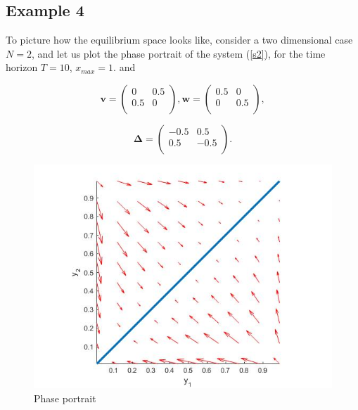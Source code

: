 \documentclass[a4paper,10pt, english]{article}
\begin{document}
\newpage
\newpage
\newpage
\subsection{Example 4}
To picture how the equilibrium space looks like, consider a two dimensional case  $N=2$, and let us plot the phase portrait of the system (\ref{s2}), for the time horizon $T = 10$, $x_{max} = 1$. and

\[\mathbf{v} =  \left( \begin{array}{cc}
0 & 0.5  \\
0.5 & 0 \\
\end{array} \right),
%
\mathbf{w} = 
\left( \begin{array}{cc}
0.5 & 0 \\
0 & 0.5 \\
\end{array} \right),
\]


$$
\mathbf{\Delta} = 
\left(
\begin{matrix}
-0.5 & 0.5 \\
0.5 & -0.5 \\
\end{matrix}
\right).
$$


\begin{figure}[ht]
\label{fig_c3}
\centering
\includegraphics[scale= 0.4]{3.jpg}
\caption{Phase portrait}
\end{figure}
\end{document}
